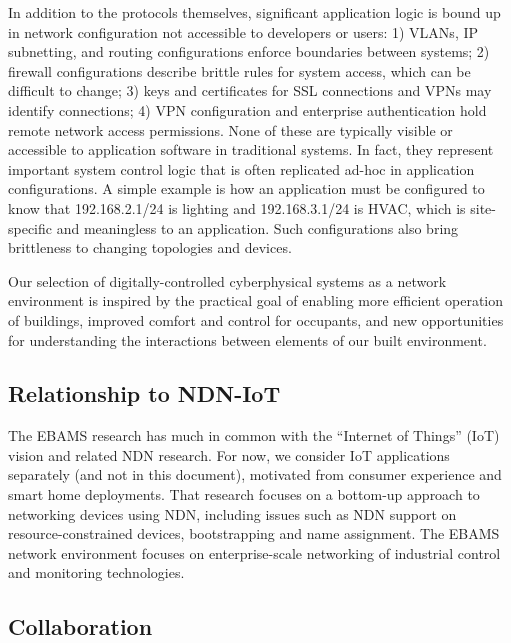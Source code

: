 In addition to the protocols themselves, significant application logic is bound up in network configuration not accessible to developers or users: 1) VLANs, IP subnetting, and routing configurations enforce boundaries between systems;
2) firewall configurations describe brittle rules for system access, which can be difficult to change; 3) keys and certificates for SSL connections and VPNs may identify connections; 4) VPN configuration and enterprise authentication hold remote network access permissions. None of these are typically visible or accessible to application software in traditional systems. In fact, they represent important system control logic that is often replicated ad-hoc in application configurations. A simple example is how an application must be configured to know that 192.168.2.1/24 is lighting and 192.168.3.1/24 is HVAC, which is site-specific and meaningless to an application.  Such configurations also bring brittleness to changing topologies and devices.

Our selection of digitally-controlled cyberphysical systems  as a
network environment is inspired by the practical goal of enabling more 
efficient operation of buildings, improved comfort and control for occupants, 
and new opportunities for understanding the interactions between elements 
of our built environment. 

\subsection{Relationship to NDN-IoT}

The EBAMS research has much in common with the ``Internet of Things'' (IoT) vision and related NDN research.  For now, we consider IoT applications separately (and not in this document), motivated from consumer experience and smart home deployments.  That research focuses on a bottom-up approach to networking devices using NDN, including issues such as NDN support on resource-constrained devices, bootstrapping and name assignment.  The EBAMS network environment focuses on enterprise-scale networking of industrial control and monitoring technologies. 

\subsection{Collaboration}

